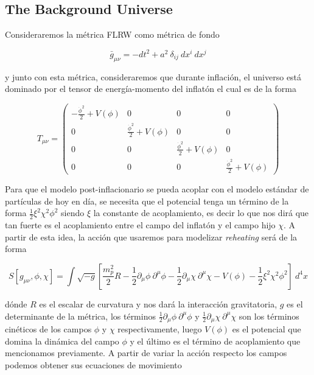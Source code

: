 \subsection{The Background Universe}

Consideraremos la métrica FLRW como métrica de fondo

\begin{equation}
    \bar{g}_{\mu\nu} = - dt^2 + a^2 \ \delta_{ij} \ dx^i \ dx^j
\end{equation}

\noindent
y junto con esta métrica, consideraremos que durante inflación, el universo está dominado por el tensor de energía-momento del inflatón el cual es de la forma

\begin{equation}
    T_{\mu\nu} = \begin{pmatrix}
        \displaystyle - \frac{\dot{\phi}^2}{2} + V(\phi) & 0 & 0 & 0\\
        0 & \displaystyle \frac{\dot{\phi}^2}{2} + V(\phi) & 0 & 0\\
        0 & 0 & \displaystyle \frac{\dot{\phi}^2}{2} + V(\phi) & 0\\
        0 & 0 & 0 & \displaystyle \frac{\dot{\phi}^2}{2} + V(\phi)
    \end{pmatrix}
\end{equation}

Para que el modelo post-inflacionario se pueda acoplar con el modelo estándar de partículas de hoy en día, se necesita que el potencial tenga un término de la forma $\displaystyle \frac{1}{2} \xi^2 \chi^2 \phi^2$ siendo $\xi$ la constante de acoplamiento, es decir lo que nos dirá que tan fuerte es el acoplamiento entre el campo del inflatón y el campo hijo $\chi$. A partir de esta idea, la acción que usaremos para modelizar \textit{reheating} será de la forma

\begin{equation}
    S [g_{\mu\nu}, \phi, \chi] = \int \sqrt{- g} \left[ \frac{m_p^2}{2} R - \frac{1}{2} \partial_\mu \phi \ \partial^\mu \phi - \frac{1}{2} \partial_\mu \chi \ \partial^\mu \chi - V (\phi) - \frac{1}{2} \xi^2 \chi^2 \phi^2 \right] \ d^4 x
\end{equation}

\noindent
dónde $R$ es el escalar de curvatura y nos dará la interacción gravitatoria, $g$ es el determinante de la métrica, los términos $\displaystyle \frac{1}{2} \partial_\mu \phi \ \partial^\mu \phi$ y $\displaystyle \frac{1}{2} \partial_\mu \chi \ \partial^\mu \chi$ son los términos cinéticos de los campos $\phi$ y $\chi$ respectivamente, luego $V(\phi)$ es el potencial que domina la dinámica del campo $\phi$ y el último es el término de acoplamiento que mencionamos previamente. A partir de variar la acción respecto los campos podemos obtener sus ecuaciones de movimiento


